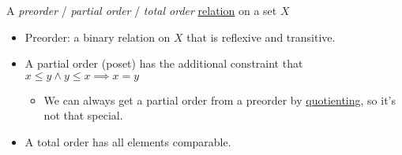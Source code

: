 
A \emph{preorder} / \emph{partial order} / \emph{total order} \href{doc/1 math/Seven Sketches in Compositionality/1 Generative Effects/2 What is order/Relation}{relation} on a set $X$

\begin{itemize}
    \item Preorder: a binary relation on $X$ that is reflexive and transitive.
    \item A partial order (poset) has the additional constraint that $x \leq y \land y \leq x \implies x=y$
          \begin{itemize}\item We can always get a partial order from a preorder by \href{doc/1 math/Seven Sketches in Compositionality/1 Generative Effects/2 What is order/Quotient}{quotienting}, so it's not that special.\end{itemize}
    \item A total order has all elements comparable.
  \end{itemize}